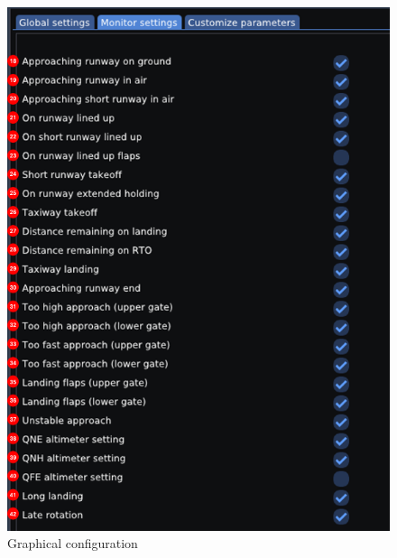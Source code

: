 \documentclass[a4paper,12pt]{article}
\begin{document}
\begin{figure}[H]
\vspace{.5em}
\begin{center}
\includegraphics[width=\textwidth]{../src/config_window_2.png}
\end{center}
\caption{Graphical configuration}
\label{GUIConfigurationWindow2}
\end{figure}
\end{document}
